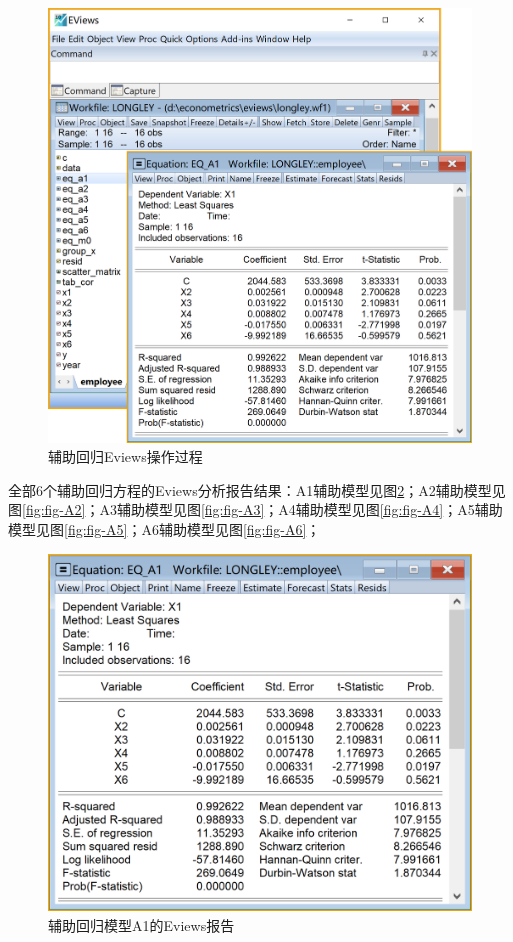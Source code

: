 \documentclass[12pt,(landscape,a4paper),(portrait,a4paper)]{article}
\begin{document}
\begin{figure}

{\centering \includegraphics[width=8in]{picture/lab5-multilinearity/3-auxiliary-model} 

}

\caption{辅助回归Eviews操作过程}\label{fig:fig-auxiliary}
\end{figure}

全部6个辅助回归方程的Eviews分析报告结果：A1辅助模型见图\ref{fig:fig-A1}；A2辅助模型见图\ref{fig:fig-A2}；A3辅助模型见图\ref{fig:fig-A3}；A4辅助模型见图\ref{fig:fig-A4}；A5辅助模型见图\ref{fig:fig-A5}；A6辅助模型见图\ref{fig:fig-A6}；

\begin{figure}

{\centering \includegraphics[width=8in]{picture/lab5-multilinearity/3-A1} 

}

\caption{辅助回归模型A1的Eviews报告}\label{fig:fig-A1}
\end{figure}
\end{document}

